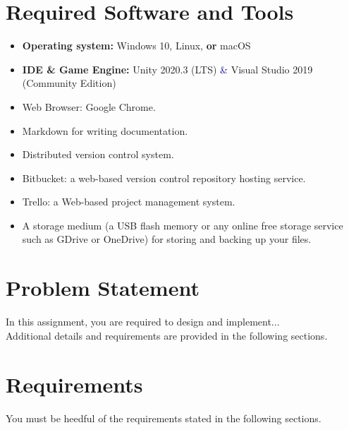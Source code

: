 \documentclass[11pt, a4paper]{article}
\begin{document}
\section{Required Software and Tools }  
\label{sec:requiredsw}    
\begin{itemize}[itemsep=2pt,parsep=0pt,topsep=2pt,partopsep=2pt]
    \item[\color{darkblue}\faLaptopCode] \textbf{Operating system:} \faWindows {} Windows  10,  \faLinux {} Linux, \textcolor{vanierred}{\textbf{or}} \faApple {} macOS 
    \item[\color{darkblue}\faCode] \textbf{IDE \& Game Engine:} \faUnity Unity \textcolor{vanierred}{2020.3 (LTS)} \textcolor{darkblue}{\&} Visual Studio \textcolor{vanierred}{2019} (Community Edition)
    \item [{\color{darkblue}\faChrome}] Web Browser: Google Chrome.   
    \item[{\color{darkblue} \faWpforms}] Markdown for writing documentation.
    \item[{\color{darkblue} \faGitSquare}] Distributed version control system.
    \item[{\color{darkblue} \faBitbucket}] Bitbucket: a web-based version control repository hosting service.
    \item[{\color{darkblue} \faTrello}] Trello: a Web-based project management system.
    
    \item[\color{darkblue}\faUsb]

    A storage medium (a USB flash memory or any online free storage service such as GDrive or OneDrive) for storing and backing up your files. 
\end{itemize}   

\section{Problem Statement}       
\label{sec:intro}    
\vspace{-.1cm}
\noindent In this assignment, you are required to design and implement...\\
\noindent \blindtext
\noindent Additional details and requirements are provided in the following sections.
          
    \section{Requirements}       
    \label{sec:requirements}    
    \vspace{-.1cm}
    \noindent You must be heedful of the requirements stated in the following sections. 
    
\end{document}
